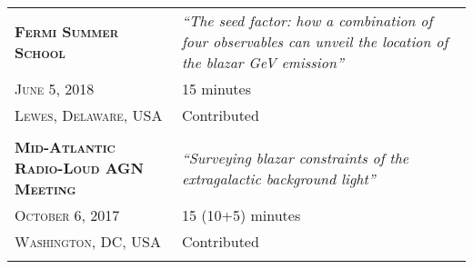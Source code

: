 \begin{longtable}{p{5cm}|p{12.3cm}}
    \textsc{\textbf{Fermi Summer School}}& \emph{``The seed factor: how a combination of four observables can unveil the location of the blazar GeV emission''}\\
    \textsc{June 5, 2018}& 15 minutes\\
    \textsc{Lewes, Delaware, USA}& Contributed\\
    \multicolumn{2}{c}{} \\


    \textsc{\textbf{Mid-Atlantic Radio-Loud AGN Meeting}}& \emph{``Surveying blazar constraints of the extragalactic background light''}\\
    \textsc{October 6, 2017}& 15 (10+5) minutes\\
    \textsc{Washington, DC, USA}& Contributed\\
    \multicolumn{2}{c}{} \\


\end{longtable}
